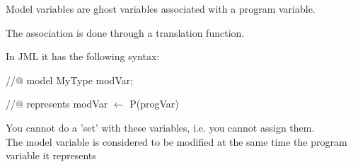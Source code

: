 \small
\blist
\item Model variables are ghost variables {\purple associated} with a program variable.
\item The association is done through a translation function.
\item In JML it has the following syntax:
  \blist 
  \item //@ {\purple model} MyType modVar;
  \item //@ {\purple represents} modVar $\leftarrow$ P(progVar)
  \elist
\item You cannot do a 'set' with these variables, i.e. you cannot
  {\purple assign} them.\\
\rarrow The model variable is considered to be modified 
at the same time the program variable it represents
\elist

